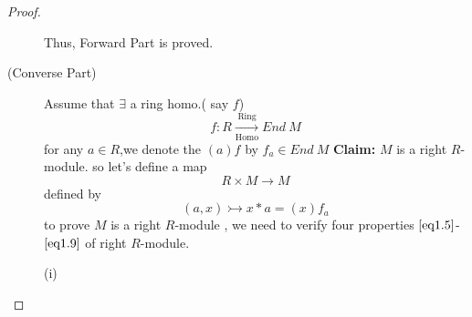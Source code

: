 \begin{proof}
\begin{description}
\bigskip
Thus, Forward Part is proved.\newline\bigskip
\item[(Converse Part)] 
\bigskip
Assume that $\exists$ a ring homo.( say $f$) 
\[ f: R\xrightarrow[\text{Homo}]{\text{Ring}} End \ M \]
for any $a \in R$,we denote the $(a)f$ by $f_a \in End \ M$\newline
\textbf{Claim:} $M$ is a right $R$-module.\newline
so let's define a map 
\[ R\times M \longrightarrow M \] defined by 
\[ (a , x ) \rightarrowtail x*a = (x)f_a \]
to prove $M$ is a right $R$-module , we need to verify four properties $\eqref{eq1.5}$- $\eqref{eq1.9}$ of right $R$-module.
\begin{description}
	\item[(i)]
\end{description}

\end{description}
\end{proof}
